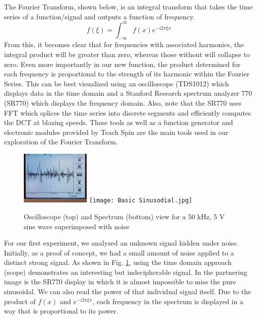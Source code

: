 \documentclass[prl,twocolumn,superscriptaddress,floatfix]{revtex4}
\begin{document}
The Fourier Transform, shown below, is an integral transform that takes the time series of a function/signal and outputs a function of frequency. 
\begin{equation}
f(\xi) = \int_{-\infty}^{\infty} f(x)e^{-i2\pi \xi x}  \label{firstequation}
\end{equation}
From this, it becomes clear that for frequencies with associated harmonics, the integral product will be greater than zero, whereas those without will collapse to zero.
Even more importantly in our new function, the product determined for each frequency is proportional to the strength of its harmonic within the Fourier Series.
This can be best visualized using an oscilloscope (TDS1012) which displays data in the time domain and a Stanford Research spectrum analyzer 770 (SR770) which displays the frequency domain.
Also, note that the SR770 uses FFT which splices the time series into discrete segments and efficiently computes the DCT at blazing speeds. These tools as well as a function generator and electronic modules provided
by Teach Spin are the main tools used in our exploration of the Fourier Transform.

\begin{figure}[H]
    \begin{center}
    \includegraphics[width = 0.3\textwidth]{Time Data.jpg}
    \texttt{[image: Basic Sinusodial.jpg]}
    \caption{\label{fig:1}Oscilloscope (top) and Spectrum (bottom) view for a 50 kHz, 5 V sine wave superimposed with noise}
    \end{center}
\end{figure}
For our first experiment, we analyzed an unknown signal hidden under noise. Initially, as a proof of concept, we had a small amount of noise applied to a distinct strong signal.
As shown in Fig. \ref{fig:1}, using the time domain approach (scope) demonstrates an interesting but indecipherable signal.
In the partnering image is the SR770 display in which it is almost impossible to miss the pure sinusoidal. 
We can also read the power of that individual signal itself. Due to the product of $f(x)$ and $e^{-i2 \pi \xi x}$, each frequency in the spectrum is displayed in a way that is proportional to its power.
\end{document}
